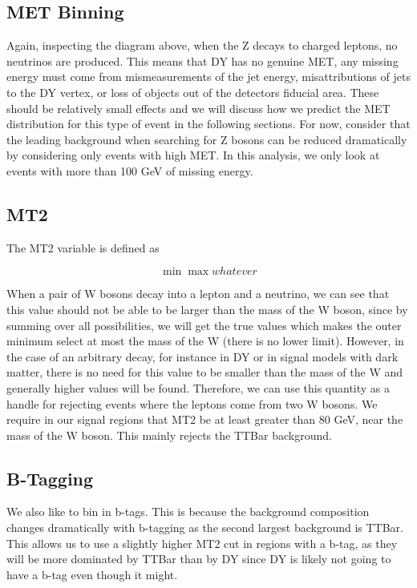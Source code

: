 \subsection{MET Binning}
Again, inspecting the diagram above, when the Z decays to charged leptons, no neutrinos are produced. This means that DY has no genuine MET, any missing energy must come from mismeasurements of the jet energy, misattributions of jets to the DY vertex, or loss of objects out of the detectors fiducial area. These should be relatively small effects and we will discuss how we predict the MET distribution for this type of event in the following sections. For now, consider that the leading background when searching for Z bosons can be reduced dramatically by considering only events with high MET. In this analysis, we only look at events with more than 100 GeV of missing energy.

\subsection{MT2}
The MT2 variable is defined as

\[
\min\max{whatever}
\]

When a pair of W bosons decay into a lepton and a neutrino, we can see that this value should not be able to be larger than the mass of the W boson, since by summing over all possibilities, we will get the true values which makes the outer minimum select at most the mass of the W (there is no lower limit). However, in the case of an arbitrary decay, for instance in DY or in signal models with dark matter, there is no need for this value to be smaller than the mass of the W and generally higher values will be found. Therefore, we can use this quantity as a handle for rejecting events where the leptons come from two W bosons. We require in our signal regions that MT2 be at least greater than 80 GeV, near the mass of the W boson. This mainly rejects the TTBar background. 

\subsection{B-Tagging}
We also like to bin in b-tags. This is because the background composition changes dramatically with b-tagging as the second largest background is TTBar. This allows us to use a slightly higher MT2 cut in regions with a b-tag, as they will be more dominated by TTBar than by DY since DY is likely not going to have a b-tag even though it might.

